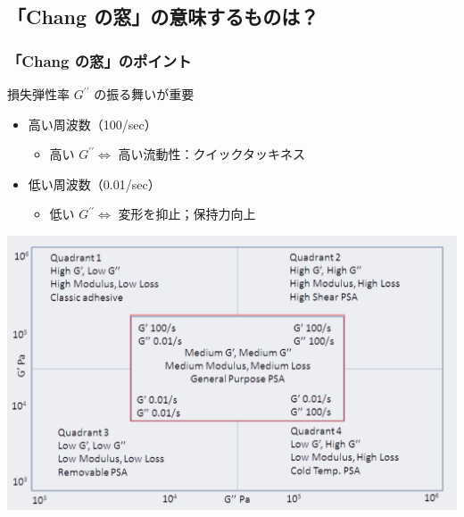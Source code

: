 \documentclass[unicode,12pt]{beamer}%
\begin{document}
\subsection{「Chang の窓」の意味するものは？}
\begin{frame}
	\frametitle{「Chang の窓」のポイント}
	\begin{alertblock}{損失弾性率 $G^{\prime \prime}$ の振る舞いが重要}
		\begin{itemize}
			\item 高い周波数（100/sec）
			\begin{itemize}
				\item 高い $G^{\prime \prime} \Leftrightarrow$ 高い流動性：クイックタッキネス
			\end{itemize}
			\item 低い周波数（0.01/sec）
			\begin{itemize}
				\item 低い $G^{\prime \prime} \Leftrightarrow$ 変形を抑止；保持力向上
			\end{itemize}
		\end{itemize}

		\vspace{3mm}
		\centering
			\includegraphics[width=.5\textwidth]{ChangFrequencies_2.png}
	\end{alertblock}	
\end{frame}
\end{document}
